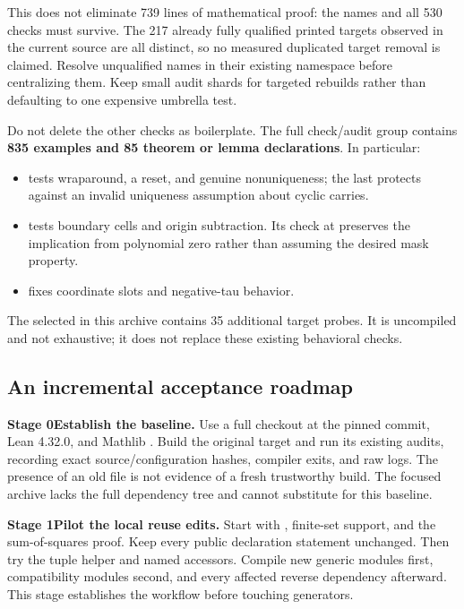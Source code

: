 This does not eliminate 739 lines of mathematical proof: the names and all
530 checks must survive. The 217 already fully qualified printed targets
observed in the current source are all distinct, so no measured duplicated
target removal is claimed. Resolve unqualified names in their existing
namespace before centralizing them. Keep small audit shards for targeted
rebuilds rather than defaulting to one expensive umbrella test.

Do not delete the other checks as boilerplate. The full check/audit group
contains \textbf{835 examples and 85 theorem or lemma declarations}.
In particular:

\begin{itemize}
\item {} tests wraparound, a reset,
and genuine nonuniqueness; the last protects against an invalid uniqueness
assumption about cyclic carries.
\item {} tests boundary cells
and origin subtraction. Its check at
 preserves the implication
from polynomial zero rather than assuming the desired mask property.
\item {} fixes coordinate slots and
negative-tau behavior.
\end{itemize}

The selected  in this archive contains 35
additional target probes. It is uncompiled and not exhaustive; it does not
replace these existing behavioral checks.

\subsection{An incremental acceptance roadmap}
\label{sec:roadmap}

\textbf{Stage 0\quad Establish the baseline.}
Use a full checkout at the pinned commit, Lean 4.32.0, and Mathlib
. Build the original target
and run its existing audits, recording exact source/configuration hashes,
compiler exits, and raw logs. The presence of an old  file
is not evidence of a fresh trustworthy build. The focused archive lacks
the full dependency tree and cannot substitute for this baseline.

\textbf{Stage 1\quad Pilot the local reuse edits.}
Start with , finite-set support, and the
sum-of-squares proof. Keep every public declaration statement unchanged.
Then try the tuple helper and named accessors. Compile new generic modules
first, compatibility modules second, and every affected reverse dependency
afterward. This stage establishes the workflow before touching generators.

